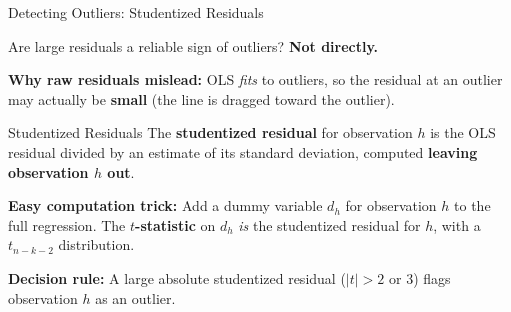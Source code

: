 \documentclass[aspectratio=169, 12pt]{beamer}
\begin{document}
\begin{frame}[shrink=10]{Detecting Outliers: Studentized Residuals}

  Are large residuals a reliable sign of outliers? \textbf{Not directly.}

  \begin{keybox}
    \textbf{Why raw residuals mislead:} OLS \emph{fits} to outliers, so the residual at an
    outlier may actually be \textbf{small} (the line is dragged toward the outlier).
  \end{keybox}

  \begin{definitionbox}{Studentized Residuals}
    The \textbf{studentized residual} for observation $h$ is the OLS residual divided by an
    estimate of its standard deviation, computed \textbf{leaving observation $h$ out}.

    \medskip
    \textbf{Easy computation trick:} Add a dummy variable $d_h$ for observation $h$ to the
    full regression. The \textbf{$t$-statistic} on $d_h$ \emph{is} the studentized residual
    for $h$, with a $t_{n-k-2}$ distribution.
  \end{definitionbox}

  \textbf{Decision rule:} A large absolute studentized residual ($|t| > 2$ or 3) flags
  observation $h$ as an outlier.

\end{frame}
\end{document}
